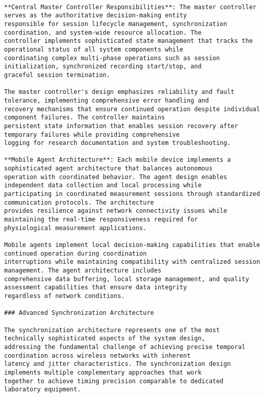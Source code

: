 \documentclass[12pt,a4paper]{report}
\begin{document}
\begin{verbatim}

**Central Master Controller Responsibilities**: The master controller serves as the authoritative decision-making entity
responsible for session lifecycle management, synchronization coordination, and system-wide resource allocation. The
controller implements sophisticated state management that tracks the operational status of all system components while
coordinating complex multi-phase operations such as session initialization, synchronized recording start/stop, and
graceful session termination.

The master controller's design emphasizes reliability and fault tolerance, implementing comprehensive error handling and
recovery mechanisms that ensure continued operation despite individual component failures. The controller maintains
persistent state information that enables session recovery after temporary failures while providing comprehensive
logging for research documentation and system troubleshooting.

**Mobile Agent Architecture**: Each mobile device implements a sophisticated agent architecture that balances autonomous
operation with coordinated behavior. The agent design enables independent data collection and local processing while
participating in coordinated measurement sessions through standardized communication protocols. The architecture
provides resilience against network connectivity issues while maintaining the real-time responsiveness required for
physiological measurement applications.

Mobile agents implement local decision-making capabilities that enable continued operation during coordination
interruptions while maintaining compatibility with centralized session management. The agent architecture includes
comprehensive data buffering, local storage management, and quality assessment capabilities that ensure data integrity
regardless of network conditions.

### Advanced Synchronization Architecture

The synchronization architecture represents one of the most technically sophisticated aspects of the system design,
addressing the fundamental challenge of achieving precise temporal coordination across wireless networks with inherent
latency and jitter characteristics. The synchronization design implements multiple complementary approaches that work
together to achieve timing precision comparable to dedicated laboratory equipment.


\end{verbatim}
\end{document}
